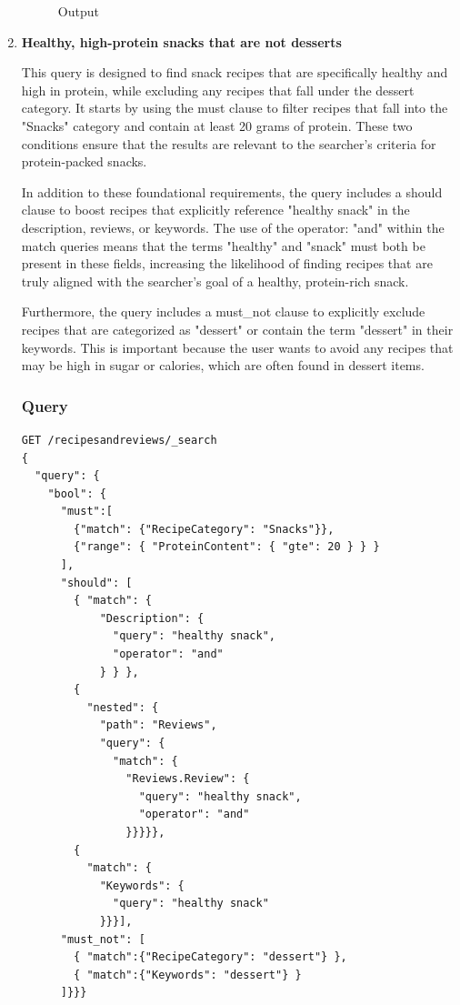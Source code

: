 \begin{enumerate}
\begin{figure}[h!]
    \caption{Output}
    \end{figure}
    
    \clearpage
    
    \item {}
          \textbf{Healthy, high-protein snacks that are not desserts}

    This query is designed to find snack recipes that are specifically healthy and high in protein, while excluding any recipes that fall under the dessert category. It starts by using the must clause to filter recipes that fall into the "Snacks" category and contain at least 20 grams of protein. These two conditions ensure that the results are relevant to the searcher's criteria for protein-packed snacks.

    In addition to these foundational requirements, the query includes a should clause to boost recipes that explicitly reference "healthy snack" in the description, reviews, or keywords. The use of the operator: "and" within the match queries means that the terms "healthy" and "snack" must both be present in these fields, increasing the likelihood of finding recipes that are truly aligned with the searcher's goal of a healthy, protein-rich snack.

    Furthermore, the query includes a must\_not clause to explicitly exclude recipes that are categorized as "dessert" or contain the term "dessert" in their keywords. This is important because the user wants to avoid any recipes that may be high in sugar or calories, which are often found in dessert items.

    \subsubsection{Query}
    \begin{lstlisting}[language=Elasticsearch]
GET /recipesandreviews/_search
{
  "query": {
    "bool": {
      "must":[
        {"match": {"RecipeCategory": "Snacks"}},
        {"range": { "ProteinContent": { "gte": 20 } } }
      ],
      "should": [
        { "match": { 
            "Description": {
              "query": "healthy snack",
              "operator": "and"
            } } },
        {
          "nested": {
            "path": "Reviews",
            "query": {
              "match": {
                "Reviews.Review": {
                  "query": "healthy snack",
                  "operator": "and"
                }}}}},
        {
          "match": {
            "Keywords": {
              "query": "healthy snack"
            }}}],
      "must_not": [
        { "match":{"RecipeCategory": "dessert"} },
        { "match":{"Keywords": "dessert"} }
      ]}}}
    \end{lstlisting}


\end{enumerate}
